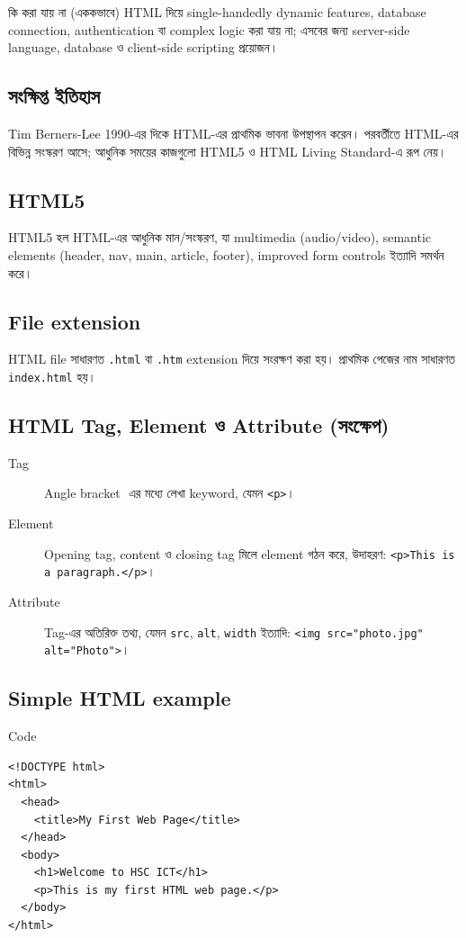 \begin{keypointbox}{কি করা যায় না (এককভাবে)}
HTML দিয়ে single-handedly dynamic features, database connection, authentication বা complex logic করা যায় না; এসবের জন্য server-side language, database ও client-side scripting প্রয়োজন।
\end{keypointbox}

\subsection{সংক্ষিপ্ত ইতিহাস}
Tim Berners-Lee 1990-এর দিকে HTML-এর প্রাথমিক ভাবনা উপস্থাপন করেন। পরবর্তীতে HTML-এর বিভিন্ন সংস্করণ আসে; আধুনিক সময়ের কাজগুলো HTML5 ও HTML Living Standard-এ রূপ নেয়।

\subsection{HTML5}
HTML5 হল HTML-এর আধুনিক মান/সংস্করণ, যা multimedia (audio/video), semantic elements (header, nav, main, article, footer), improved form controls ইত্যাদি সমর্থন করে।

\subsection{File extension}
HTML file সাধারণত \texttt{.html} বা \texttt{.htm} extension দিয়ে সংরক্ষণ করা হয়। প্রাথমিক পেজের নাম সাধারণত \texttt{index.html} হয়।

\subsection{HTML Tag, Element ও Attribute (সংক্ষেপ)}
\begin{description}
\item[Tag] Angle bracket \(< >\) এর মধ্যে লেখা keyword, যেমন \texttt{<p>}।
\item[Element] Opening tag, content ও closing tag মিলে element গঠন করে, উদাহরণ: \texttt{<p>This is a paragraph.</p>}।
\item[Attribute] Tag-এর অতিরিক্ত তথ্য, যেমন \texttt{src}, \texttt{alt}, \texttt{width} ইত্যাদি: \texttt{<img src="photo.jpg" alt="Photo">}।
\end{description}

\subsection{Simple HTML example}
\begin{examplebox}{Code}
\begin{verbatim}
<!DOCTYPE html>
<html>
  <head>
    <title>My First Web Page</title>
  </head>
  <body>
    <h1>Welcome to HSC ICT</h1>
    <p>This is my first HTML web page.</p>
  </body>
</html>
\end{verbatim}
\end{examplebox}

